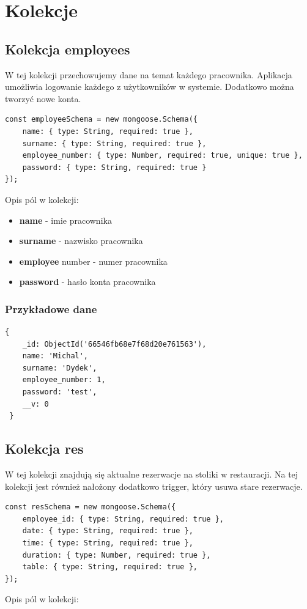 \documentclass[12pt]{article}
\begin{document}
\section{Kolekcje}
\begin{samepage}
\subsection{Kolekcja employees}
W tej kolekcji przechowujemy dane na temat każdego pracownika. Aplikacja umożliwia logowanie każdego z użytkowników w systemie. Dodatkowo można tworzyć nowe konta.
\begin{lstlisting}[caption={Employees}]
const employeeSchema = new mongoose.Schema({
    name: { type: String, required: true },
    surname: { type: String, required: true },
    employee_number: { type: Number, required: true, unique: true },
    password: { type: String, required: true }
});
\end{lstlisting}
\end{samepage}
Opis pól w kolekcji:

\begin{itemize}
	\item \textbf{name} - imie pracownika
	\item \textbf{surname} - nazwisko pracownika
	\item \textbf{employee} number - numer pracownika
	\item \textbf{password} - hasło konta pracownika
\end{itemize}

\subsubsection{Przykładowe dane}
\begin{lstlisting}[]
 {
    _id: ObjectId('66546fb68e7f68d20e761563'),
    name: 'Michal',
    surname: 'Dydek',
    employee_number: 1,
    password: 'test',
    __v: 0
 }
\end{lstlisting}


\newpage
\begin{samepage}
\subsection{Kolekcja res}
W tej kolekcji znajdują się aktualne rezerwacje na stoliki w restauracji. Na tej kolekcji jest również nałożony dodatkowo trigger, który usuwa stare rezerwacje.

\begin{lstlisting}[caption={Reservations}]
const resSchema = new mongoose.Schema({
    employee_id: { type: String, required: true },
    date: { type: String, required: true },
    time: { type: String, required: true },
    duration: { type: Number, required: true },
    table: { type: String, required: true },
});
\end{lstlisting}
\end{samepage}
Opis pól w kolekcji:
\end{document}
